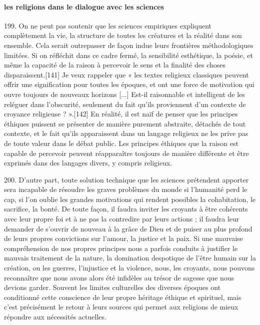 \paragraph{les religions dans le dialogue avec les sciences}    
\begin{singlequote}
        199. On ne peut pas soutenir que les sciences empiriques expliquent complètement la vie, la structure de toutes les créatures et la réalité dans son ensemble. Cela serait outrepasser de façon indue leurs frontières méthodologiques limitées. Si on réfléchit dans ce cadre fermé, la sensibilité esthétique, la poésie, et même la capacité de la raison à percevoir le sens et la finalité des choses disparaissent.[141] Je veux rappeler que « les textes religieux classiques peuvent offrir une signification pour toutes les époques, et ont une force de motivation qui ouvre toujours de nouveaux horizons [...] Est-il raisonnable et intelligent de les reléguer dans l’obscurité, seulement du fait qu’ils proviennent d’un contexte de croyance religieuse ? ».[142] En réalité, il est naïf de penser que les principes éthiques puissent se présenter de manière purement abstraite, détachés de tout contexte, et le fait qu’ils apparaissent dans un langage religieux ne les prive pas de toute valeur dans le débat public. Les principes éthiques que la raison est capable de percevoir peuvent réapparaître toujours de manière différente et être exprimés dans des langages divers, y compris religieux.

        200. D’autre part, toute solution technique que les sciences prétendent apporter sera incapable de résoudre les graves problèmes du monde si l’humanité perd le cap, si l’on oublie les grandes motivations qui rendent possibles la cohabitation, le sacrifice, la bonté. De toute façon, il faudra inviter les croyants à être cohérents avec leur propre foi et à ne pas la contredire par leurs actions ; il faudra leur demander de s’ouvrir de nouveau à la grâce de Dieu et de puiser au plus profond de leurs propres convictions sur l’amour, la justice et la paix. Si une mauvaise compréhension de nos propres principes nous a parfois conduits à justifier le mauvais traitement de la nature, la domination despotique de l’être humain sur la création, ou les guerres, l’injustice et la violence, nous, les croyants, nous pouvons reconnaître que nous avons alors été infidèles au trésor de sagesse que nous devions garder. Souvent les limites culturelles des diverses époques ont conditionné cette conscience de leur propre héritage éthique et spirituel, mais c’est précisément le retour à leurs sources qui permet aux religions de mieux répondre aux nécessités actuelles.


\end{singlequote}
